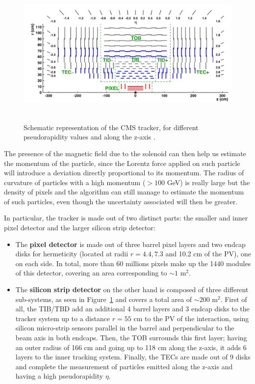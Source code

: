 \documentclass[a4paper, 10pt, openright]{report}
\begin{document}
\begin{figure}[htbp]
\begin{center}
\includegraphics[width=14cm, height=7.2cm]{figs/CMSTracker.png}
\caption{Schematic representation of the \ac{CMS} tracker, for different pseudorapidity values and along the z-axis \cite{CMSTracker}.}
\label{fig:CMSTracker}
\end{center}
\end{figure}

The presence of the magnetic field due to the solenoid can then help us estimate the momentum of the particle, since the Lorentz force applied on such particle will introduce a deviation directly proportional to its momentum. The radius of curvature of particles with a high momentum ($> 100$ GeV) is really large but the density of pixels and the algorithm can still manage to estimate the momentum of such particles, even though the uncertainty associated will then be greater.

In particular, the tracker is made out of two distinct parts: the smaller and inner pixel detector and the larger silicon strip detector:

\begin{itemize}
\item The \textbf{pixel detector} is made out of three barrel pixel layers and two endcap disks for hermeticity (located at radii $r=4.4, 7.3$ and 10.2 cm of the \ac{PV}), one on each side. In total, more than 60 millions pixels make up the 1440 modules of this detector, covering an area corresponding to $\sim 1$ m$^2$.
\item The \textbf{silicon strip detector} on the other hand is composed of three different sub-systems, as seen in Figure~\ref{fig:CMSTracker} and covers a total area of $\sim 200$ m$^2$. First of all, the \ac{TIB/TBD} add an additional 4 barrel layers and 3 endcap disks to the tracker system up to a distance $r = 55$ cm to the \ac{PV} of the interaction, using silicon micro-strip sensors parallel in the barrel and perpendicular to the beam axis in both endcaps. Then, the \ac{TOB} surrounds this first layer; having an outer radius of 166 cm and going up to 118 cm along the z-axis, it adds 6 layers to the inner tracking system. Finally, the \acp{TEC} are made out of 9 disks and complete the measurement of particles emitted along the z-axis and having a high pseudorapidity $\eta$.
\end{itemize}
\end{document}

